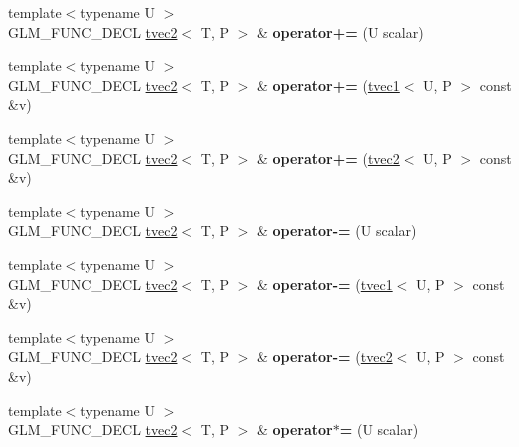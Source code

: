 \begin{DoxyCompactItemize}
{\footnotesize template$<$typename U $>$ }\\G\+L\+M\+\_\+\+F\+U\+N\+C\+\_\+\+D\+E\+CL \hyperlink{structglm_1_1tvec2}{tvec2}$<$ T, P $>$ \& {\bfseries operator+=} (U scalar)
\item 
\mbox{\label{structglm_1_1tvec2_a260a29a9ba826d24f418f01ebd274d39}} 
{\footnotesize template$<$typename U $>$ }\\G\+L\+M\+\_\+\+F\+U\+N\+C\+\_\+\+D\+E\+CL \hyperlink{structglm_1_1tvec2}{tvec2}$<$ T, P $>$ \& {\bfseries operator+=} (\hyperlink{structglm_1_1tvec1}{tvec1}$<$ U, P $>$ const \&v)
\item 
\mbox{\label{structglm_1_1tvec2_a8b512889a3d9ef4536135b1806cb19c4}} 
{\footnotesize template$<$typename U $>$ }\\G\+L\+M\+\_\+\+F\+U\+N\+C\+\_\+\+D\+E\+CL \hyperlink{structglm_1_1tvec2}{tvec2}$<$ T, P $>$ \& {\bfseries operator+=} (\hyperlink{structglm_1_1tvec2}{tvec2}$<$ U, P $>$ const \&v)
\item 
\mbox{\label{structglm_1_1tvec2_acc941bd8f14e3b52ce45433ae0ab8898}} 
{\footnotesize template$<$typename U $>$ }\\G\+L\+M\+\_\+\+F\+U\+N\+C\+\_\+\+D\+E\+CL \hyperlink{structglm_1_1tvec2}{tvec2}$<$ T, P $>$ \& {\bfseries operator-\/=} (U scalar)
\item 
\mbox{\label{structglm_1_1tvec2_ac78b83ac2b1331f1d99f1fa9465c4147}} 
{\footnotesize template$<$typename U $>$ }\\G\+L\+M\+\_\+\+F\+U\+N\+C\+\_\+\+D\+E\+CL \hyperlink{structglm_1_1tvec2}{tvec2}$<$ T, P $>$ \& {\bfseries operator-\/=} (\hyperlink{structglm_1_1tvec1}{tvec1}$<$ U, P $>$ const \&v)
\item 
\mbox{\label{structglm_1_1tvec2_a6ad11c3283bc3a6d76f92047e15d3fcc}} 
{\footnotesize template$<$typename U $>$ }\\G\+L\+M\+\_\+\+F\+U\+N\+C\+\_\+\+D\+E\+CL \hyperlink{structglm_1_1tvec2}{tvec2}$<$ T, P $>$ \& {\bfseries operator-\/=} (\hyperlink{structglm_1_1tvec2}{tvec2}$<$ U, P $>$ const \&v)
\item 
\mbox{\label{structglm_1_1tvec2_a9f36256877446354bbc7d6a3dbcb5c36}} 
{\footnotesize template$<$typename U $>$ }\\G\+L\+M\+\_\+\+F\+U\+N\+C\+\_\+\+D\+E\+CL \hyperlink{structglm_1_1tvec2}{tvec2}$<$ T, P $>$ \& {\bfseries operator$\ast$=} (U scalar)

\end{DoxyCompactItemize}
